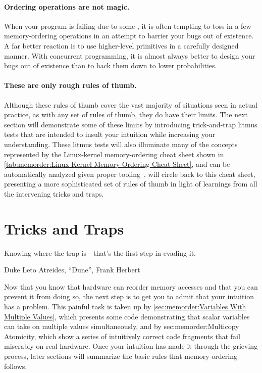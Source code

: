 \paragraph{Ordering operations are not magic.}
When your program is failing due to some , it is often
tempting to toss in a few memory-ordering operations in an attempt
to barrier your bugs out of existence.
A far better reaction is to use higher-level primitives in a carefully
designed manner.
With concurrent programming, it is almost always better to design your
bugs out of existence than to hack them down to lower probabilities.

\paragraph{These are only rough rules of thumb.}
Although these rules of thumb cover the vast majority of situations
seen in actual practice, as with any set of rules of thumb, they
do have their limits.
The next section will demonstrate some of these limits by introducing
trick-and-trap litmus tests that are intended to insult your
intuition while increasing your understanding.
These litmus tests will also illuminate many of the concepts
represented by the Linux-kernel memory-ordering cheat sheet shown in
\cref{tab:memorder:Linux-Kernel Memory-Ordering Cheat Sheet},
and can be automatically analyzed given proper
tooling~\cite{Alglave:2018:FSC:3173162.3177156}.
 will
circle back to this cheat sheet, presenting a more sophisticated set of
rules of thumb in light of learnings from all the intervening tricks
and traps.

\QuickQuizEnd

\section{Tricks and Traps}
\label{sec:memorder:Tricks and Traps}
%
\epigraph{Knowing where the trap is---that's the first step in evading it.}
	 {Duke Leto Atreides, ``Dune'', Frank Herbert}

Now that you know that hardware can reorder memory accesses and that you
can prevent it from doing so, the next step is to get you to admit
that your intuition has a problem.
This painful task is taken up by
\cref{sec:memorder:Variables With Multiple Values},
which presents some code demonstrating that scalar variables can
take on multiple values simultaneously,
and by
{sec:memorder:Multicopy Atomicity},
which show a series of intuitively correct code fragments that fail miserably
on real hardware.
Once your intuition has made it through the grieving process, later
sections will summarize the basic rules that memory ordering follows.

